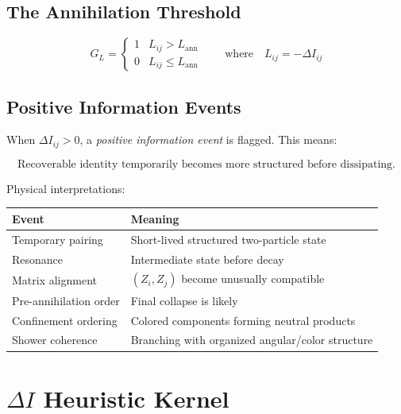 \documentclass[11pt,a4paper]{article}
\theoremstyle{defbox}
\begin{document}
\subsection{The Annihilation Threshold}

\begin{equation}
  G_L =
  \begin{cases}
	1 & L_{ij} > L_{\mathrm{ann}} \\
	0 & L_{ij} \leq L_{\mathrm{ann}}
  \end{cases}
  \qquad\text{where}\quad L_{ij} = -\Delta I_{ij}
\end{equation}

\subsection{Positive Information Events}

When $\Delta I_{ij} > 0$, a \emph{positive information event} is flagged.
This means:

\begin{equation}
  \boxed{
	\text{Recoverable identity temporarily becomes more structured before dissipating.}
  }
\end{equation}

Physical interpretations:

\begin{center}
\renewcommand{\arraystretch}{1.3}
\begin{tabular}{ll}
\toprule
\textbf{Event} & \textbf{Meaning} \\
\midrule
Temporary pairing       & Short-lived structured two-particle state \\
Resonance               & Intermediate state before decay \\
Matrix alignment        & $(Z_i, Z_j)$ become unusually compatible \\
Pre-annihilation order  & Final collapse is likely \\
Confinement ordering    & Colored components forming neutral products \\
Shower coherence        & Branching with organized angular/color structure \\
\bottomrule
\end{tabular}
\end{center}

\section{$\Delta I$ Heuristic Kernel}
\label{sec:delta_i}
\end{document}
